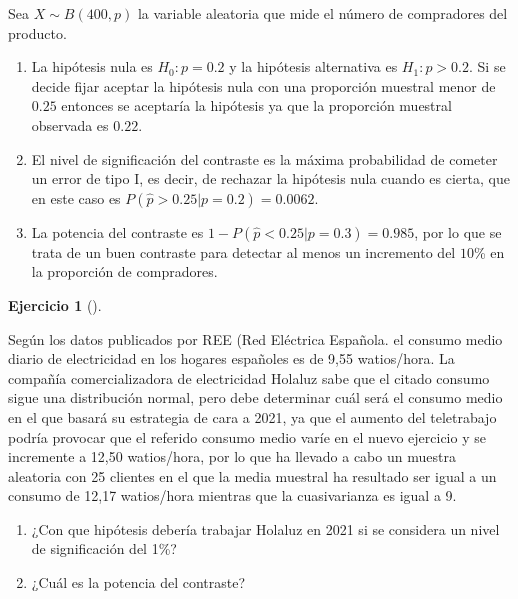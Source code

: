\documentclass[
  a4paper,
]{scrreport}
\theoremstyle{definition}
\newtheorem{exercise}{Ejercicio}[chapter]
\theoremstyle{remark}
\begin{document}
\begin{tcolorbox}[enhanced jigsaw, leftrule=.75mm, colbacktitle=quarto-callout-tip-color!10!white, opacityback=0, colback=white, toprule=.15mm, colframe=quarto-callout-tip-color-frame, coltitle=black, left=2mm, title=\textcolor{quarto-callout-tip-color}{\faLightbulb}\hspace{0.5em}{Solución}, breakable, bottomtitle=1mm, bottomrule=.15mm, opacitybacktitle=0.6, toptitle=1mm, arc=.35mm, titlerule=0mm, rightrule=.15mm]

Sea \(X\sim B(400,p)\) la variable aleatoria que mide el número de
compradores del producto.

\begin{enumerate}
\def\labelenumi{\alph{enumi}.}
\item
  La hipótesis nula es \(H_0: p=0.2\) y la hipótesis alternativa es
  \(H_1: p> 0.2\). Si se decide fijar aceptar la hipótesis nula con una
  proporción muestral menor de \(0.25\) entonces se aceptaría la
  hipótesis ya que la proporción muestral observada es \(0.22\).
\item
  El nivel de significación del contraste es la máxima probabilidad de
  cometer un error de tipo I, es decir, de rechazar la hipótesis nula
  cuando es cierta, que en este caso es
  \(P(\hat p>0.25|p=0.2) = 0.0062\).
\item
  La potencia del contraste es \(1-P(\hat p<0.25|p=0.3) = 0.985\), por
  lo que se trata de un buen contraste para detectar al menos un
  incremento del \(10\)\% en la proporción de compradores.
\end{enumerate}

\end{tcolorbox}

\begin{exercise}[]\protect\hypertarget{exr-contraste-media-consumo-electrico}{}\label{exr-contraste-media-consumo-electrico}

Según los datos publicados por REE (Red Eléctrica Española. el consumo
medio diario de electricidad en los hogares españoles es de 9,55
watios/hora. La compañía comercializadora de electricidad Holaluz sabe
que el citado consumo sigue una distribución normal, pero debe
determinar cuál será el consumo medio en el que basará su estrategia de
cara a 2021, ya que el aumento del teletrabajo podría provocar que el
referido consumo medio varíe en el nuevo ejercicio y se incremente a
12,50 watios/hora, por lo que ha llevado a cabo un muestra aleatoria con
25 clientes en el que la media muestral ha resultado ser igual a un
consumo de 12,17 watios/hora mientras que la cuasivarianza es igual a 9.

\begin{enumerate}
\def\labelenumi{\alph{enumi}.}
\item
  ¿Con que hipótesis debería trabajar Holaluz en 2021 si se considera un
  nivel de significación del 1\%?
\item
  ¿Cuál es la potencia del contraste?
\end{enumerate}

\end{exercise}
\end{document}
